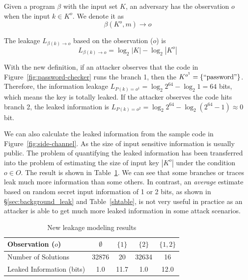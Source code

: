 \begin{mydef}
    \label{def}
    Given a program $\beta$ with the input set $K$,
    an adversary has the observation $o$ when the input $k{\in}K^o$.
    We denote it as
    $$\beta(K^o, m) \rightarrow	o$$

    The leakage $L_{\beta(k)\rightarrow o}$ based on the observation ($o$) is
    $$L_{\beta(k)\rightarrow o} = \log_2{|K|} - \log_2{|K^o|}$$
\end{mydef}

With the new definition, if an attacker observes that the code in
Figure~\ref{fig:password-checker} runs the branch 1, then the $K^{o^{1}} =
\{\mathrm{``password"}\}$. Therefore, the information leakage $L_{P(k)=o^{1}} =
\log_2{2^{64}} - \log_2{1} = 64$ bits, which means the key is totally leaked. If
the attacker observes the code hits branch 2, the leaked information is
$L_{P(k)=o^{2}} = \log_2{2^{64}} - \log_2{(2^{64}-1)} \approx 0$ bit.


We can also calculate the leaked information from the sample code in
Figure~\ref{fig:side-channel}. As the size of input sensitive information is
usually public. The problem of quantifying the leaked information has been
transferred into the problem of estimating the size of input key $|K^o|$ under
the condition $o \in O$. The result is shown in Table~\ref{shtable2}. We can see
that some branches or traces leak much more information than some others. In
contrast, an \emph{average} estimate based on random secret input information of
1 or 2 bits, as shown in \S\ref{sec:background_leak} and Table~\ref{shtable}, is
not very useful in practice as an attacker is able to get much more leaked
information in some attack scenarios.

\begin{table}[ht]
    \centering
    \caption{New leakage modeling results}
    \label{shtable2}
    \begin{tabular}{l|cccc}
        \hline
        Observation ($o$)         & $\emptyset$ & ${\{1\}}$ & ${\{2\}}$ & ${\{1, 2\}}$ \\ \hline
        Number of Solutions       & 32876       & 20        & 32634     & 16           \\ \hline
        Leaked Information (bits) & 1.0         & 11.7      & 1.0       & 12.0         \\
        \hline
    \end{tabular}
\end{table}

